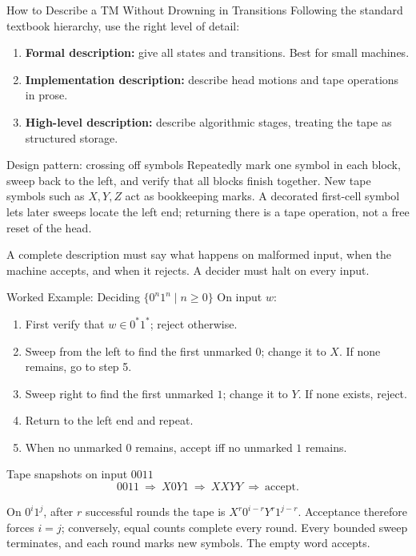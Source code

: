 \documentclass[10pt]{beamer}
\begin{document}
\begin{frame}{How to Describe a TM Without Drowning in Transitions}
  Following the standard textbook hierarchy, use the right level of detail:
  \begin{enumerate}
    \item \textbf{Formal description:} give all states and transitions. Best for small machines.
    \item \textbf{Implementation description:} describe head motions and tape operations in prose.
    \item \textbf{High-level description:} describe algorithmic stages, treating the tape as structured storage.
  \end{enumerate}
  \begin{block}{Design pattern: crossing off symbols}
    Repeatedly mark one symbol in each block, sweep back to the left, and verify that all blocks
    finish together. New tape symbols such as $X,Y,Z$ act as bookkeeping marks.
    A decorated first-cell symbol lets later sweeps locate the left end;
    returning there is a tape operation, not a free reset of the head.
  \end{block}
  \begin{alertblock}{A complete description must say}
    what happens on malformed input, when the machine accepts, and when it rejects.
    A decider must halt on every input.
  \end{alertblock}
\end{frame}

\begin{frame}{Worked Example: Deciding $\{0^n1^n\mid n\ge 0\}$}
  \small
  On input $w$:
  \begin{enumerate}
    \item First verify that $w\in 0^*1^*$; reject otherwise.
    \item Sweep from the left to find the first unmarked $0$; change it to
      $X$. If none remains, go to step 5.
    \item Sweep right to find the first unmarked $1$; change it to $Y$. If none exists, reject.
    \item Return to the left end and repeat.
    \item When no unmarked $0$ remains, accept iff no unmarked $1$ remains.
  \end{enumerate}
  \begin{block}{Tape snapshots on input $0011$}
    \[
      0011\ \Longrightarrow\ X0Y1\ \Longrightarrow\ XXYY\ \Longrightarrow\ \text{accept}.
    \]
  \end{block}
  On $0^i1^j$, after $r$ successful rounds the tape is
  $X^r0^{i-r}Y^r1^{j-r}$. Acceptance therefore forces $i=j$;
  conversely, equal counts complete every round. Every bounded sweep
  terminates, and each round marks new symbols. The empty word accepts.
\end{frame}
\end{document}
